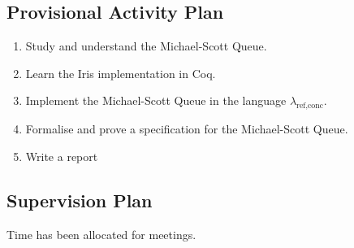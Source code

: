 \documentclass{article}
\begin{document}
\subsection*{Provisional Activity Plan}
\begin{enumerate}
    \item Study and understand the Michael-Scott Queue.
    \item Learn the Iris implementation in Coq.
    \item Implement the Michael-Scott Queue in the language $\lambda_{{\textrm{ref,conc}}}$.
    \item Formalise and prove a specification for the Michael-Scott Queue.
    \item Write a report
\end{enumerate}

\subsection*{Supervision Plan}
Time has been allocated for meetings.
\end{document}
